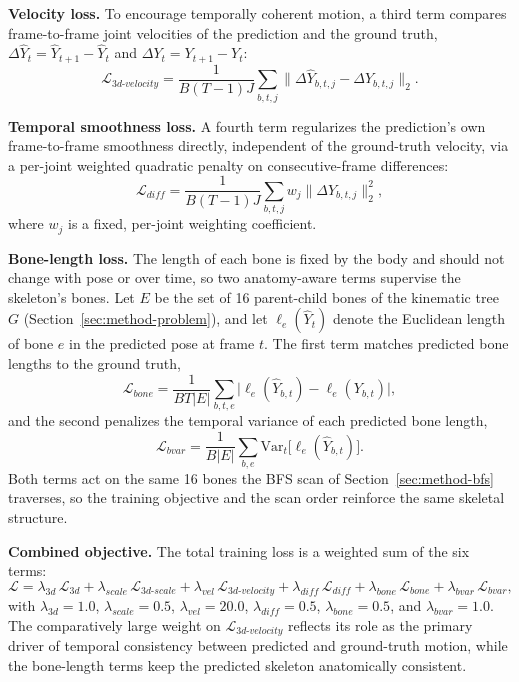 \textbf{Velocity loss.} To encourage temporally coherent motion, a third
term compares frame-to-frame joint velocities of the prediction and the
ground truth, $\Delta \hat{Y}_{t} = \hat{Y}_{t+1} - \hat{Y}_{t}$ and
$\Delta Y_{t} = Y_{t+1} - Y_{t}$:
\begin{equation}
\mathcal{L}_{3d\text{-}velocity} = \frac{1}{B(T-1)J} \sum_{b,t,j} \big\lVert \Delta \hat{Y}_{b,t,j} - \Delta Y_{b,t,j} \big\rVert_2 .
\end{equation}

\textbf{Temporal smoothness loss.} A fourth term regularizes the
prediction's own frame-to-frame smoothness directly, independent of the
ground-truth velocity, via a per-joint weighted quadratic penalty on
consecutive-frame differences:
\begin{equation}
\mathcal{L}_{diff} = \frac{1}{B(T-1)J} \sum_{b,t,j} w_j \big\lVert \Delta \hat{Y}_{b,t,j} \big\rVert_2^{2},
\end{equation}
where $w_j$ is a fixed, per-joint weighting coefficient.

\textbf{Bone-length loss.} The length of each bone is fixed by the body and
should not change with pose or over time, so two anatomy-aware terms
supervise the skeleton's bones. Let $E$ be the set of 16 parent-child bones
of the kinematic tree $G$ (Section~\ref{sec:method-problem}), and let
$\ell_e(\hat{Y}_{t})$ denote the Euclidean length of bone $e$ in the
predicted pose at frame $t$. The first term matches predicted bone lengths to
the ground truth,
\begin{equation}
\mathcal{L}_{bone} = \frac{1}{BT|E|} \sum_{b,t,e} \big| \ell_e(\hat{Y}_{b,t}) - \ell_e(Y_{b,t}) \big|,
\end{equation}
and the second penalizes the temporal variance of each predicted bone length,
\begin{equation}
\mathcal{L}_{bvar} = \frac{1}{B|E|} \sum_{b,e} \mathrm{Var}_{t}\big[ \ell_e(\hat{Y}_{b,t}) \big].
\end{equation}
Both terms act on the same 16 bones the BFS scan of
Section~\ref{sec:method-bfs} traverses, so the training objective and the
scan order reinforce the same skeletal structure.

\textbf{Combined objective.} The total training loss is a weighted sum of
the six terms:
\begin{equation}
\mathcal{L} = \lambda_{3d}\, \mathcal{L}_{3d} + \lambda_{scale}\, \mathcal{L}_{3d\text{-}scale} + \lambda_{vel}\, \mathcal{L}_{3d\text{-}velocity} + \lambda_{diff}\, \mathcal{L}_{diff} + \lambda_{bone}\, \mathcal{L}_{bone} + \lambda_{bvar}\, \mathcal{L}_{bvar},
\end{equation}
with $\lambda_{3d} = 1.0$, $\lambda_{scale} = 0.5$, $\lambda_{vel} = 20.0$,
$\lambda_{diff} = 0.5$, $\lambda_{bone} = 0.5$, and $\lambda_{bvar} = 1.0$.
The comparatively large weight on $\mathcal{L}_{3d\text{-}velocity}$ reflects
its role as the primary driver of temporal consistency between predicted and
ground-truth motion, while the bone-length terms keep the predicted skeleton
anatomically consistent.

